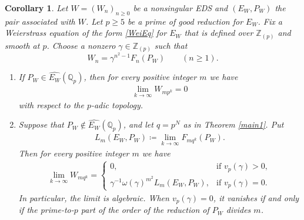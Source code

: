 \documentclass[11pt]{amsart}
\newtheorem{cor}[thm]{Corollary}
\theoremstyle{definition}
\newcommand{\Q}{\mathbb{Q}}
\newcommand{\Z}{\mathbb{Z}}
\begin{document}
\begin{cor}\label{cor EDS}
Let $W=(W_n)_{n \geq 0}$ be a nonsingular EDS and $(E_W, P_W)$ the pair associated with $W$. 
Let $p \geq 5$ be a prime of good reduction for $E_W$.
Fix a Weierstrass equation of the form \eqref{WeiEq} for $E_W$ that is
defined over $\Z_{(p)}$ and smooth at $p$.
Choose  a nonzero $\gamma \in \mathbb{Z}_{(p)}$ such that 
\[
W_n=\gamma^{n^2-1}F_n(P_W) \qquad (n\geq1).
\]
\begin{enumerate}
\item If $P_W \in \widehat{E_W}(\Q_p)$, then for every positive integer $m$ we have
%
\begin{align*}
\lim_{k \to \infty} W_{mp^{k}}=0
\end{align*}
%
with respect to the $p$-adic topology.
\item Suppose that $P_W \not\in \widehat{E_W}(\Q_p)$, and let $q=p^N$ as in Theorem \ref{main1}. Put
%
\begin{align*}
L_m(E_W, P_W) \coloneqq \lim_{k \to \infty} F_{mq^k}(P_W).
\end{align*}
%
Then for every positive integer $m$ we have
%
\begin{align*}
\lim_{k \to \infty} W_{mq^{k}}=
\begin{cases}
0, & \text{if $v_p(\gamma)>0$}, \\
\gamma^{-1}\omega(\gamma)^{m^2} L_m(E_W, P_W), & \text{if $v_p(\gamma)=0$}.
\end{cases}
\end{align*}
%
In particular, the limit is algebraic. When $v_p(\gamma)=0$, it vanishes if and only if the prime-to-$p$ part of the order of the reduction of $P_W$ divides $m$.
\end{enumerate}
\end{cor}
\end{document}
